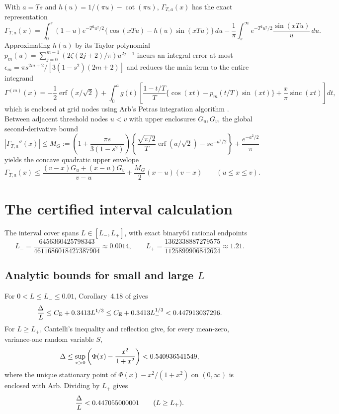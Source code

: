 \documentclass[11pt]{article}
\numberwithin{equation}{section}
\theoremstyle{remark}
\DeclareMathOperator{\sinc}{sinc}
\newcommand{\CE}{C_{\mathrm E}}
\begin{document}
With $a=Ts$ and $h(u)=1/(\pi u)-\cot(\pi u)$, $\Gamma_{T,a}(x)$ has the exact
representation
\[
 \Gamma_{T,a}(x)=\int_0^s(1-u)e^{-T^2u^2/2}
       \{\cos(xTu)-h(u)\sin(xTu)\}\,du
 -\frac1\pi\int_s^\infty e^{-T^2u^2/2}\frac{\sin(xTu)}u\,du.
\]
Approximating $h(u)$ by its Taylor polynomial
$p_m(u)=\sum_{j=0}^{m-1}(2\zeta(2j+2)/\pi)u^{2j+1}$ incurs an integral error
at most $\epsilon_m=\pi s^{2m+2}/[3(1-s^2)(2m+2)]$ and reduces the main term
to the entire integrand
\[
 \Gamma^{(m)}(x)=-\frac12\operatorname{erf}(x/\sqrt2)
 +\int_0^ag(t)\left[\frac{1-t/T}{T}
       \{\cos(xt)-p_m(t/T)\sin(xt)\}
       +\frac{x}{\pi}\sinc(xt)\right]dt,
\]
which is enclosed at grid nodes using Arb's Petras integration algorithm
\citep{Johansson2018}. Between adjacent threshold nodes $u<v$ with upper
enclosures $G_u,G_v$, the global second-derivative bound
\[
 |\Gamma_{T,a}''(x)|\le M_G:=\left(1+\frac{\pi s}{3(1-s^2)}\right)
 \left\{\frac{\sqrt{\pi/2}}T\operatorname{erf}(a/\sqrt2)
                       -s e^{-a^2/2}\right\}+\frac{e^{-a^2/2}}\pi
\]
yields the concave quadratic upper envelope
\begin{equation}\label{eq:current-gaussian-chord}
 \Gamma_{T,a}(x)\le\frac{(v-x)G_u+(x-u)G_v}{v-u}
                       +\frac{M_G}{2}(x-u)(v-x)\qquad(u\le x\le v).
\end{equation}

\section{The certified interval calculation}\label{sec:certificate}

The interval cover spans $L\in[L_-,L_+]$, with exact binary64 rational
endpoints
\begin{equation}\label{eq:exact-endpoints}
 L_-=\frac{6456360425798343}{4611686018427387904}\approx0.0014,
 \qquad
 L_+=\frac{1362338887279575}{1125899906842624}\approx1.21.
\end{equation}

\subsection{Analytic bounds for small and large $L$}

For $0<L\le L_-\le0.01$, Corollary~4.18 of \citet{Shevtsova2012} gives
\begin{equation}\label{eq:small-L}
 \frac{\Delta}{L}\le\CE+0.3413L^{1/3}
      \le\CE+0.3413L_-^{1/3}<\SmallUpper.
\end{equation}
For $L\ge L_+$, Cantelli's inequality and reflection give, for every
mean-zero, variance-one random variable $S$,
\begin{equation}\label{eq:cantelli}
 \Delta\le\sup_{x>0}\left(\Phi(x)-\frac{x^2}{1+x^2}\right)
      <0.540936541549,
\end{equation}
where the unique stationary point of $\Phi(x)-x^2/(1+x^2)$ on $(0,\infty)$
is enclosed with Arb. Dividing by $L_+$ gives
\begin{equation}\label{eq:large-L}
 \frac{\Delta}{L}<0.447055000001\qquad(L\ge L_+).
\end{equation}
\end{document}
